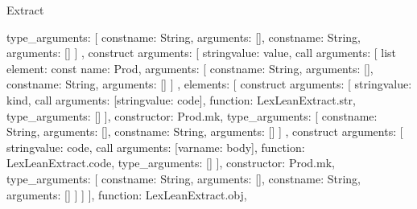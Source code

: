 \begin{lexlean}{Extract}
\begin{toolingmodule}
{{{{{{{{                        type_arguments: [
                          const{name: String, arguments: []},
                          const{name: String, arguments: []}
                        ]
                      },
                      construct{
                        arguments: [
                          string{value: value},
                          call{
                            arguments: [
                              list{
                                element: const{
                                  name: Prod,
                                  arguments: [
                                    const{name: String, arguments: []},
                                    const{name: String, arguments: []}
                                  ]
                                },
                                elements: [
                                  construct{
                                    arguments: [
                                      string{value: kind},
                                      call{
                                        arguments: [string{value: code}],
                                        function: LexLeanExtract.str,
                                        type_arguments: []
                                      }
                                    ],
                                    constructor: Prod.mk,
                                    type_arguments: [
                                      const{name: String, arguments: []},
                                      const{name: String, arguments: []}
                                    ]
                                  },
                                  construct{
                                    arguments: [
                                      string{value: code},
                                      call{
                                        arguments: [var{name: body}],
                                        function: LexLeanExtract.code,
                                        type_arguments: []
                                      }
                                    ],
                                    constructor: Prod.mk,
                                    type_arguments: [
                                      const{name: String, arguments: []},
                                      const{name: String, arguments: []}
                                    ]
                                  }
                                ]
                              }
                            ],
                            function: LexLeanExtract.obj,
}}}}}}}}}
\end{toolingmodule}
\end{lexlean}
